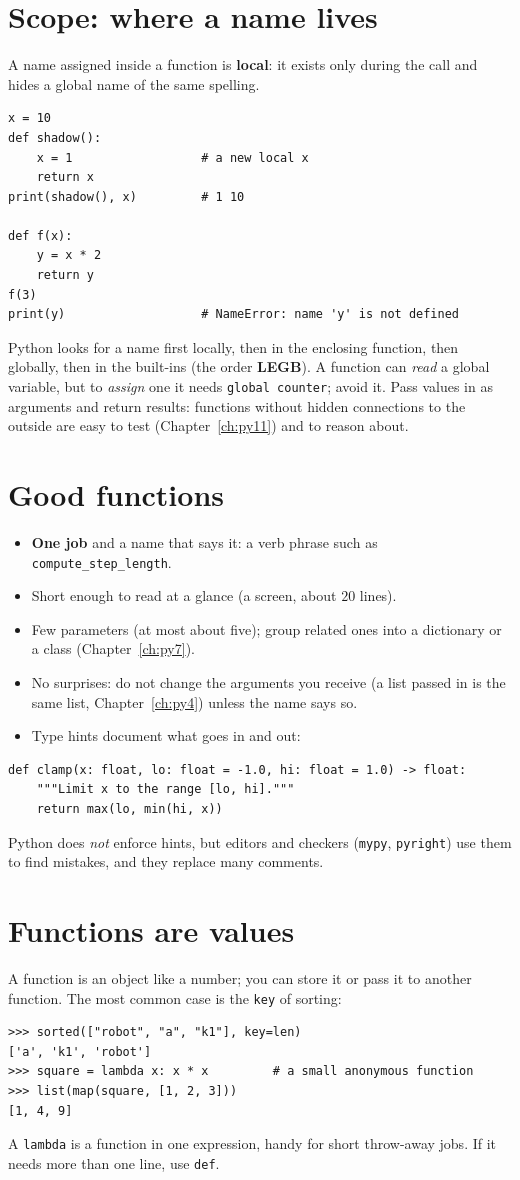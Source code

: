 \section*{Scope: where a name lives}
A name assigned inside a function is \textbf{local}: it exists only during the call and hides a global name of the same spelling.
\begin{verbatim}
x = 10
def shadow():
    x = 1                  # a new local x
    return x
print(shadow(), x)         # 1 10

def f(x):
    y = x * 2
    return y
f(3)
print(y)                   # NameError: name 'y' is not defined
\end{verbatim}
Python looks for a name first locally, then in the enclosing function, then globally, then in the built-ins (the order \textbf{LEGB}). A function can \emph{read} a global variable, but to \emph{assign} one it needs \texttt{global counter}; avoid it. Pass values in as arguments and return results: functions without hidden connections to the outside are easy to test (Chapter~\ref{ch:py11}) and to reason about.

\section*{Good functions}
\begin{itemize}[nosep]
  \item \textbf{One job} and a name that says it: a verb phrase such as \texttt{compute\_step\_length}.
  \item Short enough to read at a glance (a screen, about $20$ lines).
  \item Few parameters (at most about five); group related ones into a dictionary or a class (Chapter~\ref{ch:py7}).
  \item No surprises: do not change the arguments you receive (a list passed in is the same list, Chapter~\ref{ch:py4}) unless the name says so.
  \item Type hints document what goes in and out:
\end{itemize}
\begin{verbatim}
def clamp(x: float, lo: float = -1.0, hi: float = 1.0) -> float:
    """Limit x to the range [lo, hi]."""
    return max(lo, min(hi, x))
\end{verbatim}
Python does \emph{not} enforce hints, but editors and checkers (\texttt{mypy}, \texttt{pyright}) use them to find mistakes, and they replace many comments.

\section*{Functions are values}
A function is an object like a number; you can store it or pass it to another function. The most common case is the \texttt{key} of sorting:
\begin{verbatim}
>>> sorted(["robot", "a", "k1"], key=len)
['a', 'k1', 'robot']
>>> square = lambda x: x * x         # a small anonymous function
>>> list(map(square, [1, 2, 3]))
[1, 4, 9]
\end{verbatim}
A \texttt{lambda} is a function in one expression, handy for short throw-away jobs. If it needs more than one line, use \texttt{def}.

